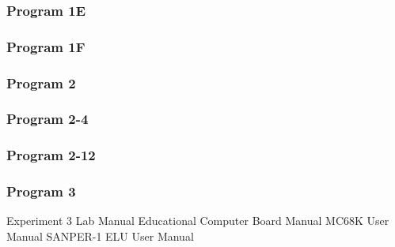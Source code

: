 \documentclass[12pt, twocolumn]{article}
\begin{document}
\subsubsection{Program 1E}\label{prog1E}

\subsubsection{Program 1F}\label{prog1F}

\subsubsection{Program 2}\label{prog2}

\subsubsection{Program 2-4}\label{prog2-4}

\subsubsection{Program 2-12}\label{prog2-12}

\subsubsection{Program 3}\label{prog3}

\begin{thebibliography}{1}
 Experiment 3 Lab Manual
 Educational Computer Board Manual
MC68K User Manual
SANPER-1 ELU User Manual


\end{thebibliography}
\end{document}

